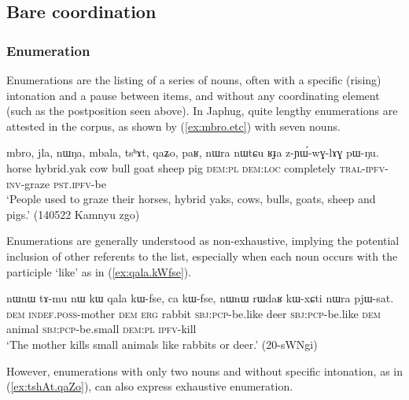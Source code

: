  
\subsection{Bare coordination} \label{sec:bare.coordination}

\subsubsection{Enumeration} \label{sec:noun.enumeration}
Enumerations are the listing of a series of nouns, often with a specific (rising) intonation and a pause between items, and without any coordinating element (such as the postposition  seen above). In Japhug, quite lengthy enumerations are attested in the corpus, as shown by (\ref{ex:mbro.etc}) with seven nouns.
\largerpage
\begin{exe}
\ex \label{ex:mbro.etc}
 \gll mbro, jla, nɯŋa, mbala, tsʰɤt, qaʑo, paʁ, nɯra nɯtɕu ʁɟa z-ɲɯ́-wɣ-lɤɣ pɯ-ŋu. \\
 horse hybrid.yak cow bull goat sheep pig \textsc{dem}:\textsc{pl} \textsc{dem}:\textsc{loc} completely \textsc{tral}-\textsc{ipfv}-\textsc{inv}-graze \textsc{pst}.\textsc{ipfv}-be \\
\glt `People used to graze their horses, hybrid yaks, cows, bulls, goats, sheep and pigs.' (140522 Kamnyu zgo)
\end{exe}

Enumerations are generally understood as non-exhaustive, implying the potential inclusion of other referents to the list, especially when each noun occurs with the participle  `like' as in (\ref{ex:qala.kWfse}).

\begin{exe}
\ex \label{ex:qala.kWfse}
 \gll  nɯnɯ tɤ-mu nɯ kɯ qala kɯ-fse, ca kɯ-fse, nɯnɯ rɯdaʁ kɯ-xɕti nɯra pjɯ-sat. \\
\textsc{dem} \textsc{indef}.\textsc{poss}-mother \textsc{dem} \textsc{erg} rabbit \textsc{sbj}:\textsc{pcp}-be.like deer \textsc{sbj}:\textsc{pcp}-be.like  \textsc{dem} animal \textsc{sbj}:\textsc{pcp}-be.small \textsc{dem}:\textsc{pl} \textsc{ipfv}-kill \\
\glt `The mother kills small animals like rabbits or deer.' (20-sWNgi)
\end{exe}

However, enumerations with only two  nouns and without specific intonation, as in (\ref{ex:tshAt.qaZo}), can also express exhaustive enumeration.  

